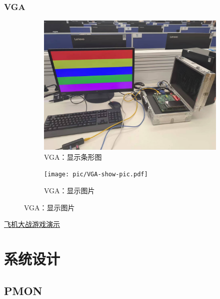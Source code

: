 \documentclass{beamer}
\begin{document}
\begin{frame}
    \frametitle{VGA}

    \begin{figure}
        \centering
        \begin{subfigure}{.45\textwidth}
            \centering
            \includegraphics[height=.7\textwidth]{pic/strip-pic.pdf}
            \caption{VGA：显示条形图}
        \end{subfigure}
        \begin{subfigure}{.45\textwidth}
            \centering
            \texttt{[image: pic/VGA-show-pic.pdf]}
            \caption{VGA：显示图片}
        \end{subfigure}
    \end{figure}

    \href{./pic/planeWar.mov}{飞机大战游戏演示}

\end{frame}

\section{系统设计}

\subsection{PMON}
\end{document}

